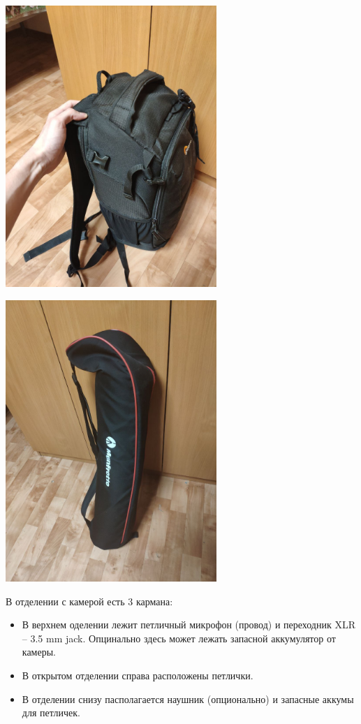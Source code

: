 \noindent\begin{minipage}[c]{0.45\textwidth}
  \centering
  \includegraphics[width=0.6\textwidth]{Images/PortableCamera/BasicSet/bag.jpg}
\end{minipage}
\begin{minipage}[c]{0.45\textwidth}
  \centering
  \includegraphics[width=0.6\textwidth]{Images/PortableCamera/BasicSet/tripod.jpg}
\end{minipage}

В отделении с камерой есть 3 кармана:
\begin{itemize}
  \item В верхнем оделении лежит петличный микрофон (провод) и переходник \textsf{XLR -- 3.5 mm jack}. Опцинально здесь может лежать запасной аккумулятор от камеры.

  \item В открытом отделении справа расположены петлички.

  \item В отделении снизу пасполагается наушник (опционально) и запасные аккумы для петличек.
\end{itemize}

